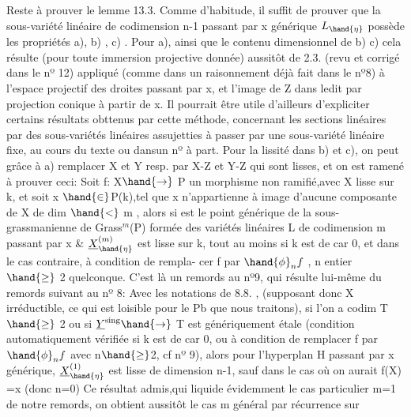
Reste à prouver le lemme 13.3.  Comme d'habitude, il suffit de prouver
que  la sous-variété linéaire de codimension n-1  passant par x générique
$L_{\hand{\eta}}$  possède les propriétés  a), b) , c) .  Pour  a), ainsi que le contenu dimensionnel de b) c) cela résulte (pour toute immersion projective donnée)
aussitôt de 2.3. (revu et corrigé dans le nº 12)  appliqué (comme dans un
raisonnement déjà fait dans le nº8) à l'espace projectif  des droites
passant par x, et l'image de Z dans ledit par projection conique à
partir de x. \hand{[}Il pourrait être utile d'ailleurs d'expliciter certains
\placedmargin{|} résultats obttenus par cette méthode, concernant les sections linéaires
par des sous-variétés linéaires assujetties à passer par une sous-variété
linéaire fixe,  au cours du texte ou dans\hand{/}un nº à part\hand{]}.  Pour la lissité dans b) et c),
 on peut grâce à a)  remplacer X et Y  resp. par X-Z et Y-Z
qui sont lisses, et on est  ramené à prouver ceci:  Soit f: X$\hand{\rightarrow}$ P un
morphisme non ramifié,\hand{(}avec X lisse sur k, et soit  x $\hand{\in}$P(k),tel que x n'appartienne à image d'aucune composante de X de dim $\hand{<}$ m , alors si
\hand{$\eta$} est le point générique  de  la sous-grassmanienne  de Grass$^{m}$(P)
formée des variétés linéaires L de codimension m passant par  x
 \& $\underline{X}^{(m)}_{\hand{\eta}}$ est  lisse sur k, tout au
\placedmargin{(} moins si k est de car 0, et dans le cas contraire, à condition de rempla-%
cer f par $\hand{\phi}_{n}f$ , n entier $\hand{\geq}$ 2 quelconque.  C'est là  un remords au nº9,
qui résulte lui-même du remords suivant au nº 8:  Avec les notations de
8.8. , (supposant donc X irréductible, ce qui est loisible pour le Pb
que nous traitons), si  l'on a codim T $\hand{\geq}$ 2  ou si  $\underline{Y}^{\text{sing}}\hand{\rightarrow}$ T  est
génériquement étale (condition automatiquement vérifiée si k est de car 0,
ou à condition de remplacer f par $\hand{\phi}_{n}f$ avec n$\hand{\geq}$2, cf nº 9), alors pour
l'hyperplan  H\hand{$_{\eta}$} passant par x  générique,  $\underline{X}^{(1)}_{\hand{\eta}}$ est lisse
de dimension n-1,  sauf dans le cas  où  on aurait  f(X) =\hand{$\{$}x\hand{$\}$}  (donc n=0)
Ce résultat admis,\hand{(}qui liquide évidemment le cas particulier m=1 de
notre remords, on obtient aussitôt le cas  m général  par récurrence sur

